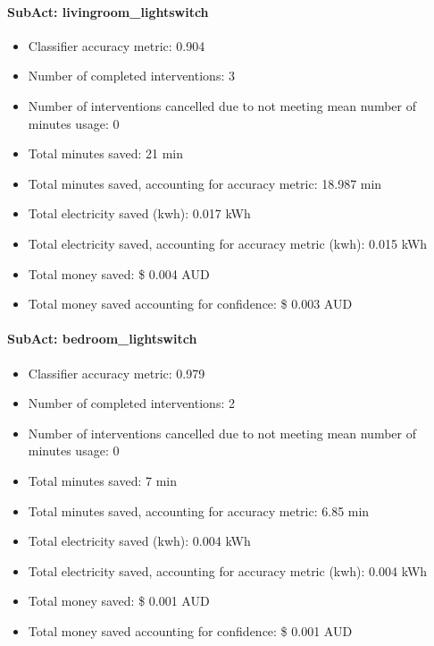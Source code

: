 \documentclass[11pt,]{article}
\providecommand{\tightlist}{%
  \setlength{\itemsep}{0pt}\setlength{\parskip}{0pt}}
\let\oldparagraph\paragraph
\renewcommand{\paragraph}[1]{\oldparagraph{#1}\mbox{}}
\begin{document}
\hypertarget{subact-livingroom_lightswitch}{%
\paragraph{SubAct:
livingroom\_lightswitch}\label{subact-livingroom_lightswitch}}

\begin{itemize}
\tightlist
\item
  Classifier accuracy metric: 0.904
\item
  Number of completed interventions: 3
\item
  Number of interventions cancelled due to not meeting mean number of
  minutes usage: 0
\item
  Total minutes saved: 21 min
\item
  Total minutes saved, accounting for accuracy metric: 18.987 min
\item
  Total electricity saved (kwh): 0.017 kWh
\item
  Total electricity saved, accounting for accuracy metric (kwh): 0.015
  kWh
\item
  Total money saved: \$ 0.004 AUD
\item
  Total money saved accounting for confidence: \$ 0.003 AUD
\end{itemize}

\hypertarget{subact-bedroom_lightswitch}{%
\paragraph{SubAct:
bedroom\_lightswitch}\label{subact-bedroom_lightswitch}}

\begin{itemize}
\tightlist
\item
  Classifier accuracy metric: 0.979
\item
  Number of completed interventions: 2
\item
  Number of interventions cancelled due to not meeting mean number of
  minutes usage: 0
\item
  Total minutes saved: 7 min
\item
  Total minutes saved, accounting for accuracy metric: 6.85 min
\item
  Total electricity saved (kwh): 0.004 kWh
\item
  Total electricity saved, accounting for accuracy metric (kwh): 0.004
  kWh
\item
  Total money saved: \$ 0.001 AUD
\item
  Total money saved accounting for confidence: \$ 0.001 AUD
\end{itemize}
\end{document}
